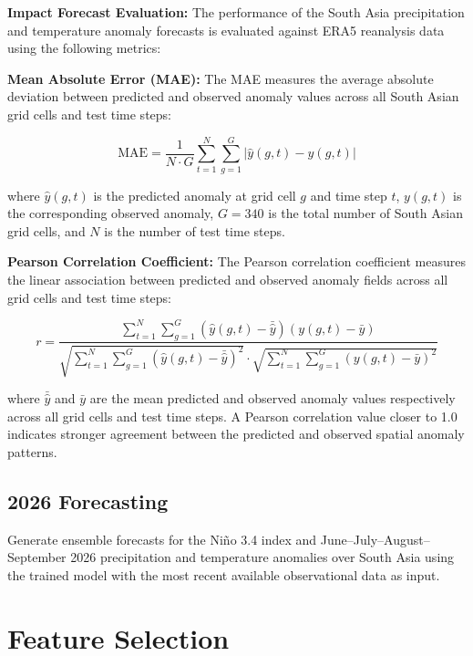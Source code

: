 \textbf{Impact Forecast Evaluation:} The performance of the South Asia precipitation and temperature anomaly forecasts is evaluated against ERA5 reanalysis data using the following metrics:

\textbf{Mean Absolute Error (MAE):}
The MAE measures the average absolute deviation between predicted and observed anomaly values across all South Asian grid cells and test time steps:

\begin{equation}
\text{MAE} = \frac{1}{N \cdot G} \sum_{t=1}^{N} \sum_{g=1}^{G} \left| \hat{y}(g,t) - y(g,t) \right|
\end{equation}

\noindent where $\hat{y}(g,t)$ is the predicted anomaly at grid cell $g$ and time step $t$, $y(g,t)$ is the corresponding observed anomaly, $G = 340$ is the total number of South Asian grid cells, and $N$ is the number of test time steps.

\textbf{Pearson Correlation Coefficient:}
The Pearson correlation coefficient measures the linear association between predicted and observed anomaly fields across all grid cells and test time steps:

\begin{equation}
r = \frac{\sum_{t=1}^{N} \sum_{g=1}^{G} \left( \hat{y}(g,t) - \bar{\hat{y}} \right) \left( y(g,t) - \bar{y} \right)}{\sqrt{\sum_{t=1}^{N} \sum_{g=1}^{G} \left( \hat{y}(g,t) - \bar{\hat{y}} \right)^{2}} \cdot \sqrt{\sum_{t=1}^{N} \sum_{g=1}^{G} \left( y(g,t) - \bar{y} \right)^{2}}}
\end{equation}

\noindent where $\bar{\hat{y}}$ and $\bar{y}$ are the mean predicted and observed anomaly values respectively across all grid cells and test time steps. A Pearson correlation value closer to 1.0 indicates stronger agreement between the predicted and observed spatial anomaly patterns.

\subsection{2026 Forecasting}
Generate ensemble forecasts for the Ni\~{n}o 3.4 index and June--July--August--September 2026 precipitation and temperature anomalies over South Asia using the trained model with the most recent available observational data as input.

\section{Feature Selection}
\label{sec:feature-selection}

